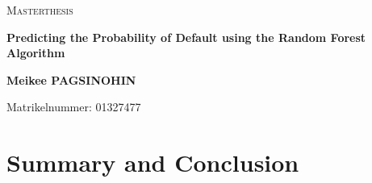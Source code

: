 \documentclass[11pt,twoside=true]{scrreprt}
\begin{document}

\begin{titlepage}
	\centering
	\vspace{1cm}
	{\scshape\LARGE Masterthesis \par}
	\vspace{1cm}
	{\scshape\Large \par}
	\vspace{1.5cm}
	{\huge\bfseries Predicting the Probability of Default using the Random Forest Algorithm \par}
	\vspace{2cm}
	\vspace{2cm}
	\vspace{2cm}
	{\Large\bfseries Meikee PAGSINOHIN \par}	
	\vfill
	{\Large Matrikelnummer: 01327477 \par}

	\vfill

\end{titlepage}

\cleardoublepage
{}  	%

\cleardoublepage
{}    %

{} 
\pagestyle{scrheadings} 

\tableofcontents



















\chapter{Summary and Conclusion}



\end{document}

